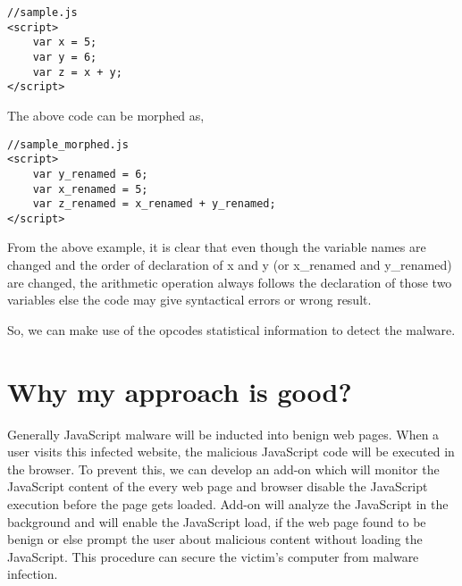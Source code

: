 \begin{lstlisting}
//sample.js
<script>
    var x = 5;
    var y = 6;
    var z = x + y;
</script>
\end{lstlisting}

The above code can be morphed as,
\begin{lstlisting}
//sample_morphed.js
<script>
    var y_renamed = 6;
    var x_renamed = 5;
    var z_renamed = x_renamed + y_renamed;
</script>
\end{lstlisting}

From the above example, it is clear that even though the variable names are changed and the order of declaration of x and y  (or x\_renamed and y\_renamed) are changed, the arithmetic operation always follows the declaration of those two variables else the code may give syntactical errors or wrong result.

So, we can make use of the opcodes statistical information to detect the malware. 

\section{Why my approach is good?}

Generally JavaScript malware will be inducted into benign web pages. When a user visits this infected website, the malicious JavaScript code will be executed in the browser. To prevent this, we can develop an add-on which will monitor the JavaScript content of the every web page and  browser disable the JavaScript execution before the page gets loaded. Add-on will analyze the JavaScript in the background and will enable the JavaScript load, if the web page found to be benign or else prompt the user about malicious content without loading the JavaScript. This procedure can secure the victim's computer from malware infection.